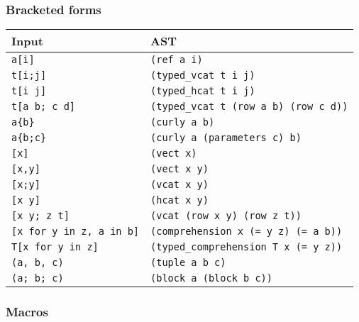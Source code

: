 \hypertarget{15884526073773577025}{}


\subsubsection{Bracketed forms}




\begin{table}[h]

\begin{tabulary}{\linewidth}{|L|L|}
\hline
Input & AST \\
\hline
\texttt{a[i]} & \texttt{(ref a i)} \\
\hline
\texttt{t[i;j]} & \texttt{(typed\_vcat t i j)} \\
\hline
\texttt{t[i j]} & \texttt{(typed\_hcat t i j)} \\
\hline
\texttt{t[a b; c d]} & \texttt{(typed\_vcat t (row a b) (row c d))} \\
\hline
\texttt{a\{b\}} & \texttt{(curly a b)} \\
\hline
\texttt{a\{b;c\}} & \texttt{(curly a (parameters c) b)} \\
\hline
\texttt{[x]} & \texttt{(vect x)} \\
\hline
\texttt{[x,y]} & \texttt{(vect x y)} \\
\hline
\texttt{[x;y]} & \texttt{(vcat x y)} \\
\hline
\texttt{[x y]} & \texttt{(hcat x y)} \\
\hline
\texttt{[x y; z t]} & \texttt{(vcat (row x y) (row z t))} \\
\hline
\texttt{[x for y in z, a in b]} & \texttt{(comprehension x (= y z) (= a b))} \\
\hline
\texttt{T[x for y in z]} & \texttt{(typed\_comprehension T x (= y z))} \\
\hline
\texttt{(a, b, c)} & \texttt{(tuple a b c)} \\
\hline
\texttt{(a; b; c)} & \texttt{(block a (block b c))} \\
\hline
\end{tabulary}

\end{table}



\hypertarget{7735912728489467540}{}


\subsubsection{Macros}




